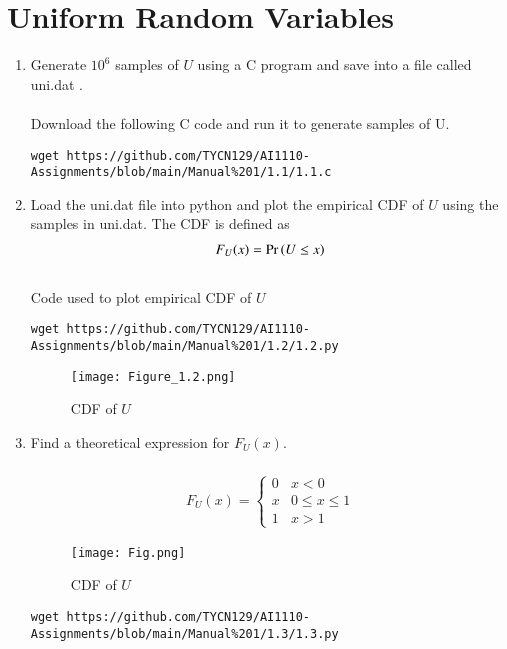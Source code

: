 \documentclass[journal,12pt,twocolumn]{IEEEtran}
\renewcommand\thesection{\arabic{section}}
\begin{document}
\section{Uniform Random Variables}
\begin{enumerate}[label=\thesection.\arabic*
,ref=\thesection.\theenumi]
\item Generate $10^6$ samples of $U$ using a C program and save into a file called uni.dat .
\\
\solution\\ 
Download the following C code and run it to generate samples of U.
\begin{lstlisting}
wget https://github.com/TYCN129/AI1110-Assignments/blob/main/Manual%201/1.1/1.1.c
\end{lstlisting}
\item Load the uni.dat file into python and plot the empirical CDF of $U$ using the samples in uni.dat. The CDF is defined as
\begin{align}
F_{U}(x) = \Pr\left(U \le x\right)
\end{align}
\\
\solution
Code used to plot empirical CDF of $U$
\begin{lstlisting}
wget https://github.com/TYCN129/AI1110-Assignments/blob/main/Manual%201/1.2/1.2.py
\end{lstlisting}
\begin{figure}[H]
    \texttt{[image: Figure\_1.2.png]}
    \caption{CDF of $U$}
    \label{fig:my_label}
\end{figure}
\item Find a  theoretical expression for $F_{U}(x)$.\\
\solution\\
\begin{align}
    \displaystyle F_U(x) = \begin{cases} 
    0 & \text{$x < 0$} \\  
    x & \text{$0 \leq x \leq 1$} \\  
    1 & \text{$x > 1$}  
    \end{cases}
\end{align}
\begin{figure}[h!]
    \centering
    \texttt{[image: Fig.png]}
    \caption{CDF of $U$}
    \label{fig:my_label}
\end{figure}
\begin{lstlisting}
wget https://github.com/TYCN129/AI1110-Assignments/blob/main/Manual%201/1.3/1.3.py
\end{lstlisting}

\end{enumerate}
\end{document}
